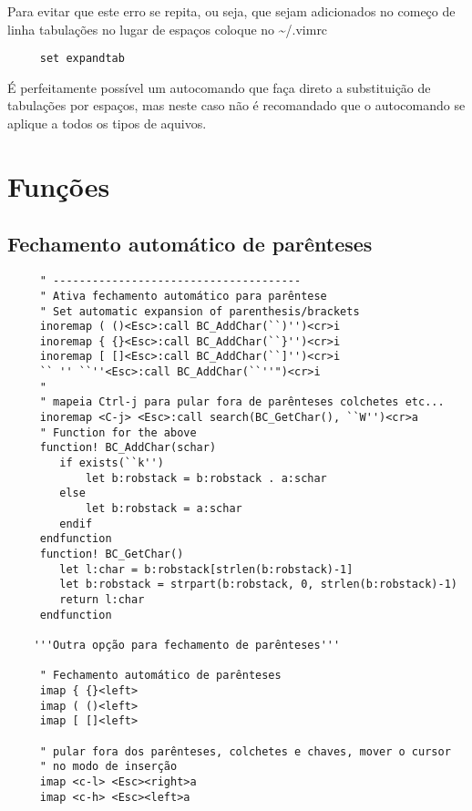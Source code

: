 Para evitar que este erro se repita, ou seja, que sejam 
adicionados no começo de linha tabulações no lugar de espaços
coloque no \textasciitilde/.vimrc

\begin{verbatim}
     set expandtab
\end{verbatim}

É perfeitamente possível um autocomando que faça direto 
a substituição de tabulações por espaços, mas neste caso não 
é recomandado que o autocomando se aplique a todos os tipos de aquivos.


\section{Funções}
\label{sec:Funções}

\subsection{Fechamento automático de parênteses}
\label{sec:Fechamento automático de parênteses}

\begin{verbatim}
     " --------------------------------------
     " Ativa fechamento automático para parêntese
     " Set automatic expansion of parenthesis/brackets
     inoremap ( ()<Esc>:call BC_AddChar(``)'')<cr>i
     inoremap { {}<Esc>:call BC_AddChar(``}'')<cr>i
     inoremap [ []<Esc>:call BC_AddChar(``]'')<cr>i
     `` '' ``''<Esc>:call BC_AddChar(``''")<cr>i
     "
     " mapeia Ctrl-j para pular fora de parênteses colchetes etc...
     inoremap <C-j> <Esc>:call search(BC_GetChar(), ``W'')<cr>a
     " Function for the above
     function! BC_AddChar(schar)
        if exists(``k'')
            let b:robstack = b:robstack . a:schar
        else
            let b:robstack = a:schar
        endif
     endfunction
     function! BC_GetChar()
        let l:char = b:robstack[strlen(b:robstack)-1]
        let b:robstack = strpart(b:robstack, 0, strlen(b:robstack)-1)
        return l:char
     endfunction
    
    '''Outra opção para fechamento de parênteses'''
    
     " Fechamento automático de parênteses
     imap { {}<left>
     imap ( ()<left>
     imap [ []<left>
    
     " pular fora dos parênteses, colchetes e chaves, mover o cursor
     " no modo de inserção
     imap <c-l> <Esc><right>a
     imap <c-h> <Esc><left>a
\end{verbatim}

